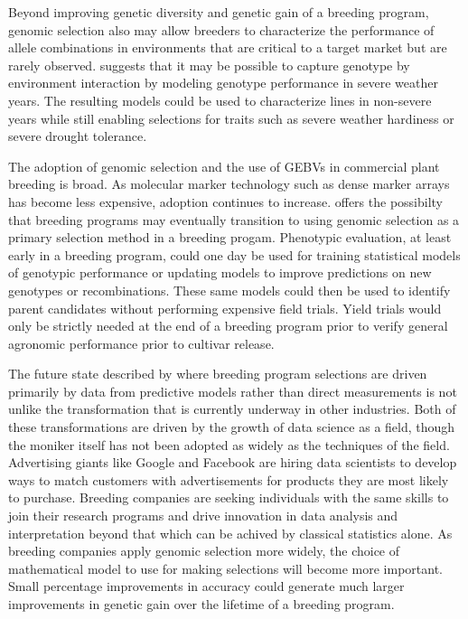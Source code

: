 Beyond improving genetic diversity and genetic gain of a breeding program, 
genomic selection also may allow breeders to characterize the performance of 
allele combinations in environments that are critical to a target market but
are rarely observed. \citet{heffner2009} suggests that it may be possible to
capture genotype by environment interaction by modeling genotype performance
in severe weather years. The resulting models could be used to characterize 
lines in non-severe years while still enabling selections for traits such as
severe weather hardiness or severe drought tolerance.

The adoption of genomic selection and the use of GEBVs in commercial plant
breeding is broad. As molecular marker technology such as dense marker 
arrays has become less expensive, adoption continues to increase. 
\citet{heffner2009} offers the possibilty that breeding programs may 
eventually transition to using genomic selection as a primary selection method
in a breeding progam. Phenotypic evaluation, at least early in a breeding 
program, could one day be used for training statistical models of genotypic 
performance or updating models to improve predictions on new genotypes 
or recombinations. These same models could then be used to identify 
parent candidates without performing expensive field trials.
Yield trials would only be strictly needed at the end of a breeding program
prior to verify general agronomic performance prior to cultivar release.

The future state described by \citet{heffner2009} where breeding program
selections are driven primarily by data from predictive models rather than
direct measurements is not unlike the transformation that is currently
underway in other industries. Both of these transformations are driven by the 
growth of data science as a field, though the moniker itself has not
been adopted as widely as the techniques of the field.
Advertising giants like Google and Facebook are hiring data scientists to develop
ways to match customers with advertisements for products they are 
most likely to purchase. Breeding companies are seeking individuals with the same skills to
join their research programs and drive innovation in data analysis and
interpretation beyond that which can be achived by classical statistics
alone. As breeding companies apply genomic selection more widely, the choice of 
mathematical model to use for making selections will become more important. 
Small percentage improvements in accuracy could generate much larger
improvements in genetic gain over the lifetime of a breeding program.



